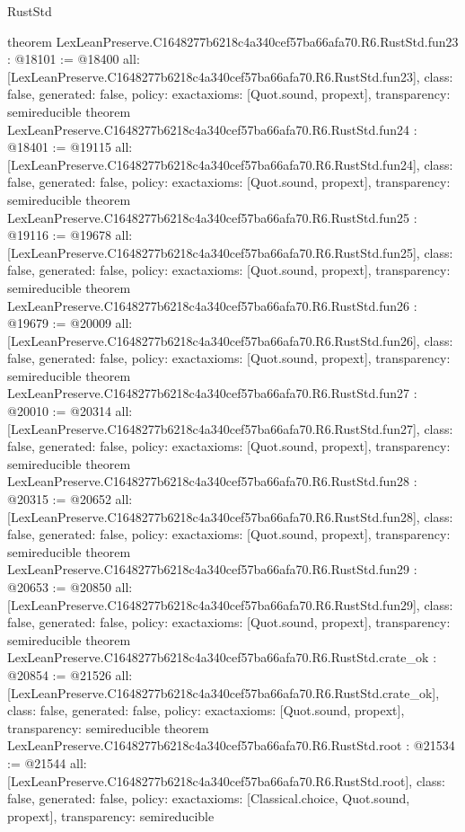 \begin{lexlean}{RustStd}
\begin{coremodule}
{}
theorem LexLeanPreserve.C1648277b6218c4a340cef57ba66afa70.R6.RustStd.fun23 : @18101 := @18400 {
  all: [LexLeanPreserve.C1648277b6218c4a340cef57ba66afa70.R6.RustStd.fun23],
  class: false,
  generated: false,
  policy: exact{axioms: [Quot.sound, propext]},
  transparency: semireducible
}
theorem LexLeanPreserve.C1648277b6218c4a340cef57ba66afa70.R6.RustStd.fun24 : @18401 := @19115 {
  all: [LexLeanPreserve.C1648277b6218c4a340cef57ba66afa70.R6.RustStd.fun24],
  class: false,
  generated: false,
  policy: exact{axioms: [Quot.sound, propext]},
  transparency: semireducible
}
theorem LexLeanPreserve.C1648277b6218c4a340cef57ba66afa70.R6.RustStd.fun25 : @19116 := @19678 {
  all: [LexLeanPreserve.C1648277b6218c4a340cef57ba66afa70.R6.RustStd.fun25],
  class: false,
  generated: false,
  policy: exact{axioms: [Quot.sound, propext]},
  transparency: semireducible
}
theorem LexLeanPreserve.C1648277b6218c4a340cef57ba66afa70.R6.RustStd.fun26 : @19679 := @20009 {
  all: [LexLeanPreserve.C1648277b6218c4a340cef57ba66afa70.R6.RustStd.fun26],
  class: false,
  generated: false,
  policy: exact{axioms: [Quot.sound, propext]},
  transparency: semireducible
}
theorem LexLeanPreserve.C1648277b6218c4a340cef57ba66afa70.R6.RustStd.fun27 : @20010 := @20314 {
  all: [LexLeanPreserve.C1648277b6218c4a340cef57ba66afa70.R6.RustStd.fun27],
  class: false,
  generated: false,
  policy: exact{axioms: [Quot.sound, propext]},
  transparency: semireducible
}
theorem LexLeanPreserve.C1648277b6218c4a340cef57ba66afa70.R6.RustStd.fun28 : @20315 := @20652 {
  all: [LexLeanPreserve.C1648277b6218c4a340cef57ba66afa70.R6.RustStd.fun28],
  class: false,
  generated: false,
  policy: exact{axioms: [Quot.sound, propext]},
  transparency: semireducible
}
theorem LexLeanPreserve.C1648277b6218c4a340cef57ba66afa70.R6.RustStd.fun29 : @20653 := @20850 {
  all: [LexLeanPreserve.C1648277b6218c4a340cef57ba66afa70.R6.RustStd.fun29],
  class: false,
  generated: false,
  policy: exact{axioms: [Quot.sound, propext]},
  transparency: semireducible
}
theorem LexLeanPreserve.C1648277b6218c4a340cef57ba66afa70.R6.RustStd.crate_ok : @20854 := @21526 {
  all: [LexLeanPreserve.C1648277b6218c4a340cef57ba66afa70.R6.RustStd.crate_ok],
  class: false,
  generated: false,
  policy: exact{axioms: [Quot.sound, propext]},
  transparency: semireducible
}
theorem LexLeanPreserve.C1648277b6218c4a340cef57ba66afa70.R6.RustStd.root : @21534 := @21544 {
  all: [LexLeanPreserve.C1648277b6218c4a340cef57ba66afa70.R6.RustStd.root],
  class: false,
  generated: false,
  policy: exact{axioms: [Classical.choice, Quot.sound, propext]},
  transparency: semireducible
}


\end{coremodule}
\end{lexlean}

